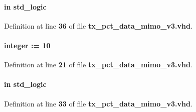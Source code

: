 \paragraph[{fifo\+\_\+rclk}]{ {\bfseries \textcolor{keywordflow}{in}\textcolor{vhdlchar}{ }} {\bfseries \textcolor{comment}{std\+\_\+logic}\textcolor{vhdlchar}{ }} \hspace{0.3cm}{\ttfamily [Port]}}\label{classtx__pct__data__mimo__v3_a55bba49a6eee1be8306afc2b165c4586}


Definition at line {\bf 36} of file {\bf tx\+\_\+pct\+\_\+data\+\_\+mimo\+\_\+v3.\+vhd}.

\paragraph[{fifo\+\_\+size}]{ {\bfseries \textcolor{vhdlchar}{ }} {\bfseries \textcolor{comment}{integer}\textcolor{vhdlchar}{ }\textcolor{vhdlchar}{ }\textcolor{vhdlchar}{\+:}\textcolor{vhdlchar}{=}\textcolor{vhdlchar}{ }\textcolor{vhdlchar}{ } \textcolor{vhdldigit}{10} \textcolor{vhdlchar}{ }} \hspace{0.3cm}{\ttfamily [Generic]}}\label{classtx__pct__data__mimo__v3_a22180059fd8cb98bf508670c8fe15583}


Definition at line {\bf 21} of file {\bf tx\+\_\+pct\+\_\+data\+\_\+mimo\+\_\+v3.\+vhd}.

\paragraph[{fifo\+\_\+wclk}]{ {\bfseries \textcolor{keywordflow}{in}\textcolor{vhdlchar}{ }} {\bfseries \textcolor{comment}{std\+\_\+logic}\textcolor{vhdlchar}{ }} \hspace{0.3cm}{\ttfamily [Port]}}\label{classtx__pct__data__mimo__v3_ad816c4d6f187ff1a9c6480fbdd3b7e52}


Definition at line {\bf 33} of file {\bf tx\+\_\+pct\+\_\+data\+\_\+mimo\+\_\+v3.\+vhd}.

